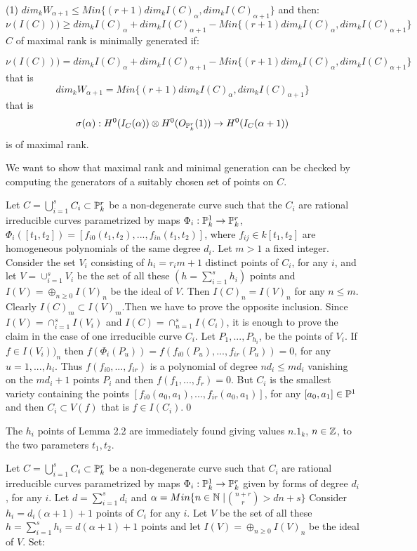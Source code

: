 (1) $dim_k W_{\alpha+1} \leq Min\{(r+1)dim_k I(C)_\alpha,dim_k
I(C)_{\alpha+1}\}$
and then:
$$ \nu (I(C)))  \geq 
dim_k I(C)_\alpha+ dim_k I(C)_{\alpha+1}-Min\{(r+1)dim_k I(C)_\alpha,dim_k
I(C)_{\alpha+1}\}$$
   $C$ of maximal rank
is minimally generated if:

$$ \nu (I(C))) =
dim_kI(C)_\alpha+
dim_kI(C)_{\alpha+1}-Min\{(r+1)dim_kI(C)_\alpha,dim_kI(C)_{\alpha+1}\}$$
that is
$$dim_kW_{\alpha+1}=Min\{(r+1)dim_kI(C)_\alpha,dim_kI(C)_{\alpha+1}\}$$
that is 
$$\sigma(\alpha): H^0(I_C(\alpha))
 \otimes H^0(O_{\Bbb P^r_k}(1)) \to H^0(I_C(\alpha+1))$$
is of maximal rank. \enddefinition

We want to show that maximal rank and minimal generation can be checked by
computing the generators of a suitably chosen set of points on
$C$.\medskip

 Let $C=$$\bigcup_{i=1}^s$$ C_i  \subset \Bbb P_k^r$
 be a  non-degenerate  curve
such that the $C_i$ are rational irreducible curves parametrized by maps 
$\Phi_i:\Bbb P_k^1 \rightarrow \Bbb P_k^r$,
 $\Phi_i([t_1,t_2])=[f_{i0}(t_1,t_2),...,f_{in}(t_1,t_2)]$, 
where $f_{ij}\in k[t_1,t_2]$
are homogeneous polynomials of the same degree $d_i$.
Let $m>1$ a fixed integer. Consider the set $V_i$ consisting of 
$h_i=r_im+1$ distinct
 points  of $C_i$, for any $i$, and 
let $V=\cup_{i=1}^s V_i$ be the set of all these $(h=\sum_{i=1}^s h_i)$
points and 
$I(V)= \oplus_{n\geq 0} I(V)_n$
be the ideal of $V$.
 Then $I(C)_n=I(V)_n$
for any $n\leq m$.\endproclaim
{} Clearly $I(C)_m\subset I(V)_m$.Then we have  to prove the
opposite 
inclusion.
Since $I(V)= \cap_{i=1}^s I(V_i)$  and  $I(C)= \cap_{n=1}^s I(C_i)$, 
it is enough to prove the claim in the case 
of one irreducible curve $C_i$. Let $P_1,...,P_{h_i}$, 
 be the points of $V_i$.
 If $f\in I(V_i))_n$ then
$f(\Phi_i(P_u))=f(f_{i0}(P_u),...,f_{ir}(P_u))=0$, for any $u=1,...,h_i$.
 Thus $f(f_{i0},...,f_{ir})$ is a
polynomial of degree $nd_i\leq md_i$ vanishing on the 
$md _i+1$  points $P_i$ and then
$f(f_1,...,f_r)=0$. But $C_i$ is the smallest variety containing
the points $[f_{i0}(a_0,a_1),...,f_{ir}(a_0,a_1)]$, for any 
$[a_0,a_1]\in \Bbb P^1$
and then $C_i \subset V(f)$
that is $f\in I(C_i)$.\qed\enddemo
 
 

 The $h_i$ points of Lemma 2.2 are immediately found
giving  values $n.1_k$, $n\in \Bbb Z$, to the
two parameters $t_1,t_2$.\endproclaim

 Let $C=$$\bigcup_{i=1}^s$$ C_i  \subset \Bbb P_k^r$
 be a non-degenerate curve
such that $C_i$ are rational irreducible curves parametrized by maps 
$\Phi_i:\Bbb P_k^1 \rightarrow \Bbb P_k^r$
given by forms of degree $d_i$ , for any $i$. Let $d=\sum_{i=1}^s d_i$ and 
$\alpha=Min\{n\in\Bbb N\mid $$n+r\choose r$$ > dn+s\}$
Consider $h_i=d_i(\alpha+1)+1$ points of $C_i$ for any $i$.
Let $V$ be the set of all these $h=\sum_{i=1}^s h_i=d(\alpha+1)+1$ points
and let 
$I(V)= \oplus_{n\geq 0} I(V)_n$
 be the ideal of $V$. Set:

